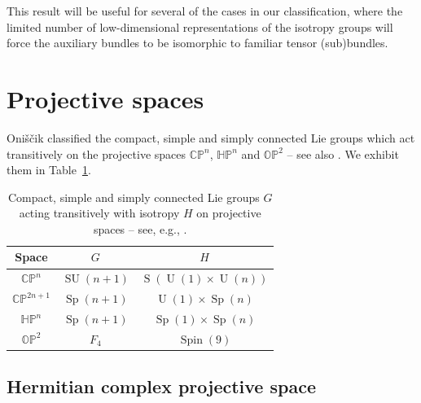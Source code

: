 \documentclass[pdftex]{sigma}
\numberwithin{equation}{section}
\DeclareMathOperator{\Spin}{Spin}
\DeclareMathOperator{\SU}{SU}
\DeclareMathOperator{\Sp}{Sp}
\DeclareMathOperator{\U}{U}
\DeclareMathOperator{\Special}{S}
\begin{document}
		This result will be useful for several of the cases in our classification, where the limited number of low-dimensional representations of the isotropy groups will force the auxiliary bundles to be isomorphic to familiar tensor (sub)bundles.
		
		
		
		
		
		\section{Projective spaces}\label{section:projective}
		
		Oni\v{s}\v{c}ik \cite[p.\ 163]{oni} classified the compact, simple and simply connected Lie groups which act transitively on the projective spaces $\mathbb{CP}^n$, $\mathbb{HP}^n$ and $\mathbb{OP}^2$ -- see also \cite[p.\ 356]{ziller}. We exhibit them in Table~\ref{table:groups}.
		
		\begin{table}[h!]
			\centering
			\begin{tabular}{ c c c }
				\toprule
				Space & $G$ & $H$ \\
				\toprule
				$\mathbb{CP}^{n}$ & $\SU(n+1)$ & $\Special ( \U(1) \times \U(n) )$ \\
				$\mathbb{CP}^{2n+1}$ & $\Sp(n+1)$ & $\U(1) \times \Sp(n)$ \\
				\midrule
				$\mathbb{HP}^{n}$ & $\Sp(n+1)$ & $\Sp(1) \times \Sp(n)$ \\
				\midrule
				$\mathbb{OP}^{2}$ & $F_4$ & $\Spin(9)$ \\
				\bottomrule
			\end{tabular}
			\caption{Compact, simple and simply connected Lie groups $G$ acting transitively with isotropy $H$ on projective spaces -- see, e.g., \cite[p.~356]{ziller}. }
			\label{table:groups}
		\end{table}
		
		\subsection{Hermitian complex projective space}\label{section:her_cpn}
		
\end{document}
